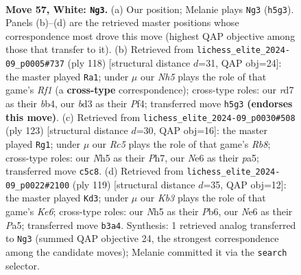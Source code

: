 \documentclass[11pt]{article}
\begin{document}
\clearpage

\begin{figure}[p]\centering
\begin{subfigure}{0.46\textwidth}\centering
\resizebox{\linewidth}{!}{%
\newchessgame
\chessboard[
  setfen={8/k2r4/4N3/2RB1p1N/1P6/1K1b4/6P1/8 w - - 10 57},
  showmover=false,
  pgfstyle=straightmove, color=movearrow, markmove={h5-g3}
]}
\caption{}
\end{subfigure}\hfill
\begin{subfigure}{0.46\textwidth}\centering
\resizebox{\linewidth}{!}{%
\newchessgame
\chessboard[
  setfen={8/5k2/8/2P5/1b1B1P2/6P1/p2r4/5RK1 w - - 1 60},
  showmover=false,
  pgfstyle=straightmove, color=movearrow, markmove={f1-a1}
]}
\caption{}
\end{subfigure}
\\[4pt]
\begin{subfigure}{0.46\textwidth}\centering
\resizebox{\linewidth}{!}{%
\newchessgame
\chessboard[
  setfen={8/7p/7P/P1K1R1B1/4b3/2P2k2/8/1r6 b - - 10 62},
  showmover=false,
  pgfstyle=straightmove, color=movearrow, markmove={b1-g1}
]}
\caption{}
\end{subfigure}\hfill
\begin{subfigure}{0.46\textwidth}\centering
\resizebox{\linewidth}{!}{%
\newchessgame
\chessboard[
  setfen={8/8/1p6/p5p1/P1Rb4/4k3/1r6/3K4 b - - 2 60},
  showmover=false,
  pgfstyle=straightmove, color=movearrow, markmove={e3-d3}
]}
\caption{}
\end{subfigure}
\caption{\textbf{Move 57, White: \texttt{Ng3}.} (a) Our position; Melanie plays \texttt{Ng3} (\texttt{h5g3}). Panels (b)--(d) are the retrieved master positions whose correspondence most drove this move (highest QAP objective among those that transfer to it). (b) Retrieved from \texttt{lichess\_elite\_2024-09\_p0005\#737} (ply 118) [structural distance $d$=31, QAP obj=24]: the master played \texttt{Ra1}; under $\mu$ our \emph{Nh5} plays the role of that game's \emph{Rf1} (a \textbf{cross-type} correspondence); cross-type roles: our \emph{r}d7 as their \emph{b}b4, our \emph{b}d3 as their \emph{P}f4; transferred move \texttt{h5g3} \textbf{(endorses this move)}. (c) Retrieved from \texttt{lichess\_elite\_2024-09\_p0030\#508} (ply 123) [structural distance $d$=30, QAP obj=16]: the master played \texttt{Rg1}; under $\mu$ our \emph{Rc5} plays the role of that game's \emph{Rb8}; cross-type roles: our \emph{N}h5 as their \emph{P}h7, our \emph{N}e6 as their \emph{p}a5; transferred move \texttt{c5c8}. (d) Retrieved from \texttt{lichess\_elite\_2024-09\_p0022\#2100} (ply 119) [structural distance $d$=35, QAP obj=12]: the master played \texttt{Kd3}; under $\mu$ our \emph{Kb3} plays the role of that game's \emph{Ke6}; cross-type roles: our \emph{N}h5 as their \emph{P}b6, our \emph{N}e6 as their \emph{P}a5; transferred move \texttt{b3a4}. Synthesis: 1 retrieved analog transferred to \texttt{Ng3} (summed QAP objective 24, the strongest correspondence among the candidate moves); Melanie committed it via the \texttt{search} selector.}
\label{fig:thought-m112}
\end{figure}
\end{document}
